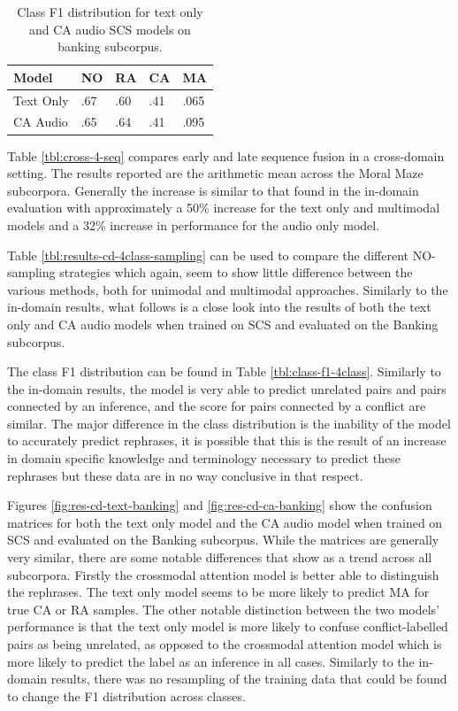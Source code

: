 \documentclass[twocolumn]{article}
\begin{document}
\begin{table}[h]
\centering
\caption{Class F1 distribution for text only and CA audio SCS models on banking subcorpus.\label{tbl:class-f1-4class-banking}}
\begin{tabular}{|l|llll|}
\hline
Model     & NO & RA & CA & MA              \\ \hline
Text Only & .67         & .60         & .41         & .065 \\
CA Audio  & .65         & .64         & .41         & .095 \\ \hline
\end{tabular}
\end{table}

Table \ref{tbl:cross-4-seq} compares early and late sequence
fusion in a cross-domain setting. The results reported are the
arithmetic mean across the Moral Maze subcorpora. Generally the increase
is similar to that found in the in-domain evaluation with approximately
a 50\% increase for the text only and multimodal models and a 32\%
increase in performance for the audio only model.

Table \ref{tbl:results-cd-4class-sampling} can be used to compare the
different NO-sampling strategies which again, seem to show little
difference between the various methods, both for unimodal and multimodal
approaches. Similarly to the in-domain results, what follows is a close
look into the results of both the text only and CA audio models when
trained on SCS and evaluated on the Banking subcorpus.

The class F1 distribution can be found in Table
\ref{tbl:class-f1-4class}. Similarly to the in-domain results, the model
is very able to predict unrelated pairs and pairs connected by an
inference, and the score for pairs connected by a conflict are similar.
The major difference in the class distribution is the inability of the
model to accurately predict rephrases, it is possible that this is the
result of an increase in domain specific knowledge and terminology
necessary to predict these rephrases but these data are in no way
conclusive in that respect.

Figures \ref{fig:res-cd-text-banking} and \ref{fig:res-cd-ca-banking}
show the confusion matrices for both the text only model and the CA
audio model when trained on SCS and evaluated on the Banking subcorpus.
While the matrices are generally very similar, there are some notable
differences that show as a trend across all subcorpora. Firstly the
crossmodal attention model is better able to distinguish the rephrases.
The text only model seems to be more likely to predict MA for true CA or
RA samples. The other notable distinction between the two models'
performance is that the text only model is more likely to confuse
conflict-labelled pairs as being unrelated, as opposed to the crossmodal
attention model which is more likely to predict the label as an
inference in all cases. Similarly to the in-domain results, there was no
resampling of the training data that could be found to change the F1
distribution across classes.
\end{document}
